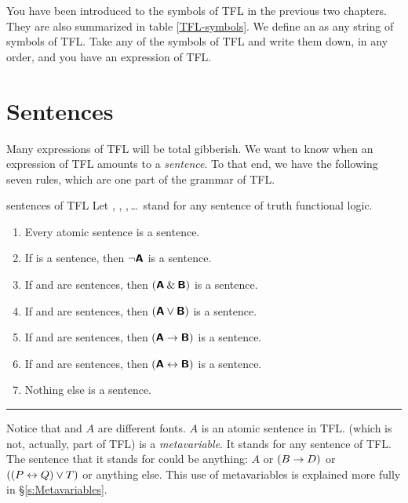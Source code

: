 You have been introduced to the symbols of TFL in the previous two chapters. They are also summarized in table \ref{TFL-symbols}. We define an  as any string of symbols of TFL. Take any of the symbols of TFL and write them down, in any order, and you have an expression of TFL.


\section{Sentences}\label{s:Sentences}
Many expressions of TFL will be total gibberish. We want to know when an expression of TFL amounts to a \emph{sentence}. To that end, we have the following seven rules, which are one part of the grammar of TFL.




\begin{factboxy}{sentences of TFL}\label{TFLsentences}
Let , , ,\,\ldots\, stand for any sentence of truth functional logic. 
	\begin{enumerate}
		\item Every atomic sentence is a sentence.
		\item If  is a sentence, then ${\neg}\bm{\mathsf{A}}$ is a sentence.
		\item If  and  are sentences, then $(\bm{\mathsf{A}}\mathbin{\&}\bm{\mathsf{B}})$ is a sentence.
		\item If  and  are sentences, then $(\bm{\mathsf{A}}\vee\bm{\mathsf{B}})$ is a sentence.
		\item If  and  are sentences, then $(\bm{\mathsf{A}}\rightarrow\bm{\mathsf{B}})$ is a sentence.
		\item If  and  are sentences, then $(\bm{\mathsf{A}}\leftrightarrow\bm{\mathsf{B}})$ is a sentence.
		\item Nothing else is a sentence.
	\end{enumerate}
\hrule
\medskip
\footnotesize{Notice that  and $A$ are different fonts. $A$ is an atomic sentence in TFL.  (which is not, actually, part of TFL) is a \textit{metavariable}. It stands for any sentence of TFL. The sentence that it stands for could be anything: $A$ or $(B \rightarrow D)$ or $((P \leftrightarrow Q) \vee T)$ or anything else. This use of {metavariables} is explained more fully in \S\ref{s:Metavariables}.}
\end{factboxy}

